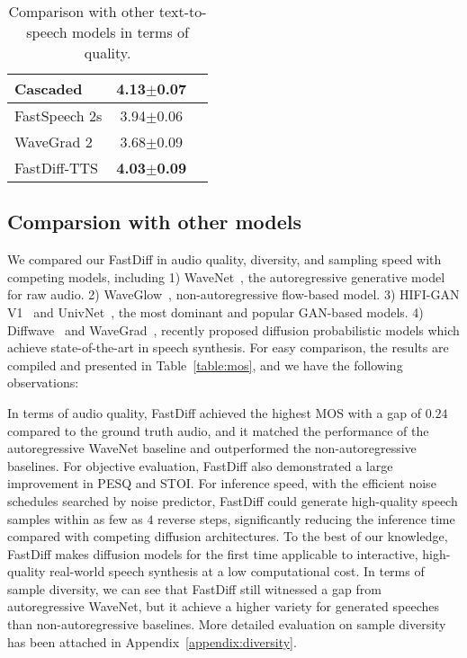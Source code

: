 \begin{table*}[ht]
\begin{minipage}[t]{0.3\linewidth}
{\begin{tabular}{lcc}
        Cascaded               &  4.13$\pm$0.07   \\
        \midrule
        FastSpeech 2s          &  3.94$\pm$0.06  \\
        WaveGrad 2             &  3.68$\pm$0.09   \\
        \midrule
        FastDiff-TTS           &  \textbf{4.03$\pm$0.09}  \\
        \bottomrule
        \end{tabular}}
        \vspace{1mm}
        \protect\caption{Comparison with other text-to-speech models in terms of quality.}
        \label{table:mos3}
      \end{minipage}
    \vspace{-2mm}
      \end{table*}

\subsection{Comparsion with other models}
We compared our FastDiff in audio quality, diversity, and sampling speed with competing models, including 1) WaveNet~\cite{oord2016wavenet}, the autoregressive generative model for raw audio. 2) WaveGlow~\cite{prenger2019waveglow}, non-autoregressive flow-based model. 3) HIFI-GAN V1~\cite{kong2020hifi} and UnivNet~\cite{jang2021univnet}, the most dominant and popular GAN-based models. 4) Diffwave~\cite{kong2020diffwave} and WaveGrad~\cite{chen2020wavegrad}, recently proposed diffusion probabilistic models which achieve state-of-the-art in speech synthesis. For easy comparison, the results are compiled and presented in Table~\ref{table:mos}, and we have the following observations: 

In terms of audio quality, FastDiff achieved the highest MOS with a gap of $0.24$ compared to the ground truth audio, and it matched the performance of the autoregressive WaveNet baseline and outperformed the non-autoregressive baselines. For objective evaluation, FastDiff also demonstrated a large improvement in PESQ and STOI. For inference speed, with the efficient noise schedules searched by noise predictor, FastDiff could generate high-quality speech samples within as few as $4$ reverse steps, significantly reducing the inference time compared with competing diffusion architectures. To the best of our knowledge, FastDiff makes diffusion models for the first time applicable to interactive, high-quality real-world speech synthesis at a low computational cost. In terms of sample diversity, we can see that FastDiff still witnessed a gap from autoregressive WaveNet, but it achieve a higher variety for generated speeches than non-autoregressive baselines. More detailed evaluation on sample diversity has been attached in Appendix~\ref{appendix:diversity}.

